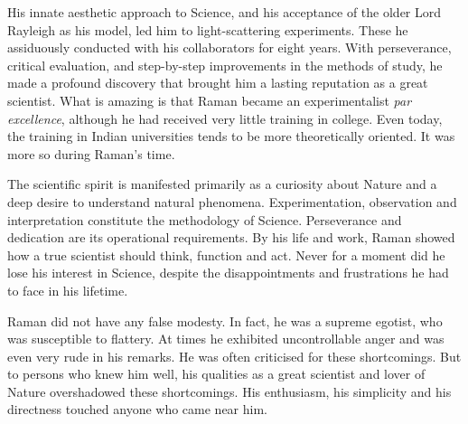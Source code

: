 His innate aesthetic approach to Science, and his acceptance
of the older Lord Rayleigh as his model, led him to light-scattering
experiments. These he assiduously conducted with his collaborators
 for eight years. With perseverance, critical evaluation, and
step-by-step improvements in the methods of study, he made a
profound discovery that brought him a lasting reputation as a
great scientist. What is amazing is that Raman became an
 experimentalist {\em par excellence}, although he had received very little
training in college. Even today, the training in Indian universities
tends to be more theoretically oriented. It was more so during
Raman's time.

The scientific spirit is manifested primarily as a curiosity
about Nature and a deep desire to understand natural phenomena.
Experimentation, observation and interpretation constitute the
methodology of Science. Perseverance and dedication are its
operational requirements. By his life and work, Raman showed
how a true scientist should think, function and act. Never for
a moment did he lose his interest in Science, despite the
disappointments and frustrations he had to face in his lifetime.

Raman did not have any false modesty. In fact, he was
a supreme egotist, who was susceptible to flattery. At times
he exhibited uncontrollable anger and was even very rude in
his remarks. He was often criticised for these shortcomings.
But to persons who knew him well, his qualities as a great
scientist and lover of Nature \hbox{overshadowed} these shortcomings.
His enthusiasm, his simplicity and his directness touched anyone
who came near him.

\bigskip
{}
\smallskip


